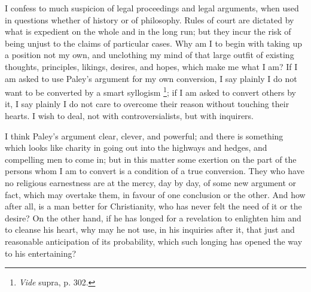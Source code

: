 I confess to much suspicion of legal proceedings and legal
arguments, when used in questions whether of history or of philosophy.
Rules of court are dictated by what is expedient on the whole and in
the long run; but they incur the risk of being unjust to the claims of
particular cases. Why am I to begin with taking up a position not my
own, and unclothing my mind of that large outfit of existing thoughts,
principles, likings, desires, and hopes, which make me what I
am? If I am asked to use Paley's argument for my own conversion, I say
plainly I do not want to be converted by a smart syllogism \footnote{\emph{Vide}
supra, p. 302.}; if I am asked to convert others by it, I say plainly I do not
care to overcome their reason without touching their hearts. I wish to
deal, not with controversialists, but with inquirers.

I think Paley's argument clear, clever, and powerful; and there is
something which looks like charity in going out into the highways and
hedges, and compelling men to come in; but in this matter some
exertion on the part of the persons whom I am to convert is a
condition of a true conversion. They who have no religious earnestness
are at the mercy, day by day, of some new argument or fact, which may
overtake them, in favour of one conclusion or the other. And how after
all, is a man better for Christianity, who has never felt the need of
it or the desire? On the other hand, if he has longed for a revelation
to enlighten him and to cleanse his heart, why may he not use, in his
inquiries after it, that just and reasonable anticipation of its
probability, which such longing has opened the way to his
entertaining?

